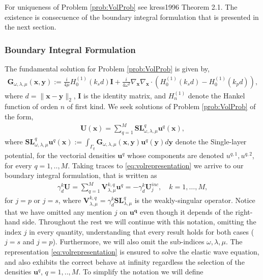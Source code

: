 \documentclass{article}
\newcommand{\vx}{\bm{x}}
\begin{document}
For uniqueness of Problem \ref{prob:VolProb} see kress1996 Theorem 2.1. The existence is consecuence of the boundary integral formulation that is presented in the next section. 

\subsubsection{Boundary Integral Formulation}

The fundamental solution for Problem \ref{prob:VolProb} is given by,  
\begin{align*}
\mathbf{G}_{\omega,\lambda, \mu} (\mathbf{x}, \mathbf{y}) := 
\frac{i}{4 \mu} H^{(1)}_0(k_s d)\mathbf{I}+ \frac{i}{4\omega^2} \nabla_\mathbf{x} 
\nabla_\mathbf{x} \cdot \left( 
H^{(1)}_0(k_sd ) - H^{(1)}_0(k_p d)
\right),
\end{align*}
where $d = \|\mathbf{x} -\mathbf{y}\|_2$, $\mathbf{I}$ is the identity matrix, and $H^{(1)}_n$ denote the Hankel function of orden $n$ of first kind. We seek solutions of Problem \ref{prob:VolProb} of the form, 
\begin{align}
\label{eq:volrepresentation}
\mathbf{U}(\vx) = \sum_{q=1}^M \mathbf{SL}^q_{\omega,\lambda, \mu} \mathbf{u}^q (\vx) , 
\end{align}
where $\mathbf{SL}^q_{\omega,\lambda, \mu}\mathbf{u}^q(\vx) := \int_{\Gamma_q} \mathbf{G}_{\omega,\lambda, \mu} (\mathbf{x}, \mathbf{y}) \mathbf{u}^q(\mathbf{y})d\mathbf{y}$ denote the Single-layer potential, for the vectorial densities $\mathbf{u}^q$ whose components are denoted $u^{q,1},u^{q,2}$, for every $q = 1,..,M$. Taking traces to \eqref{eq:volrepresentation} we arrive to our boundary integral formulation, that is written as  
\begin{align}
\label{eq:bieformulation}
\gamma^k_d \mathbf{U} = \sum_{q=1}^M \mathbf{V}^{k,q}_{\lambda,\mu} \mathbf{u}^q = -\gamma^k_d \mathbf{U}^{inc}_j, \quad k =1,\hdots,M,
\end{align}
for $j = p $ or $j =s $, where $ \mathbf{V}^{k,q}_{\lambda,\mu} = \gamma_d^k  \mathbf{SL}^q_{\lambda,\mu }$ is the weakly-singular operator.
Notice that we have omitted any mention $j$ on $\mathbf{u^q}$ even though it depends of the right-hand side. Throughout the rest we will continue with this notation, omitting the index $j$ in every quantity, understanding that every result holds for both cases ($j = s$ and $j=p$). Furthermore, we will also omit the sub-indices $\omega, \lambda, \mu$.
 The representation \eqref{eq:volrepresentation} is ensured to solve the elastic wave equation, and also exhibits the correct behave at infinity regardless the selection of the densities $\mathbf{u}^q$, $q=1,..,M$. To simplify the notation we will define 
\end{document}
